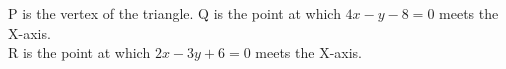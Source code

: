\documentclass[journal,12pt,twocolumn]{IEEEtran}
\renewcommand\thesection{\arabic{section}}
\begin{document}
\begin{enumerate}[label=\thesection.\arabic*.,ref=\thesection.\theenumi]
\begin{enumerate}
        P is the vertex of the triangle.
        Q is the point at which \(4x-y-8=0\) meets the X-axis.\\
        R is the point at which \(2x-3y+6=0\) meets the X-axis.\\
\end{enumerate}

\end{enumerate}
\end{document}
